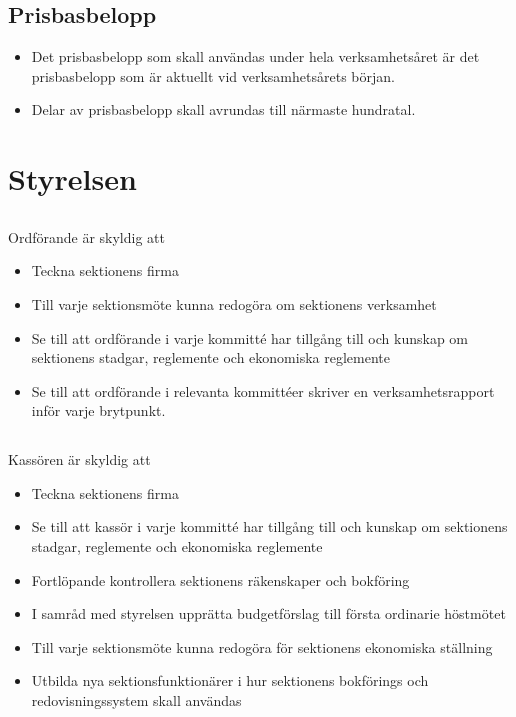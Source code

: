 \documentclass[a4paper, 10pt]{article}
\begin{document}
\subsection{Prisbasbelopp}
\begin{itemize}
  \item Det prisbasbelopp som skall användas under hela verksamhetsåret är det prisbasbelopp som är aktuellt vid verksamhetsårets början.
  \item Delar av prisbasbelopp skall avrundas till närmaste hundratal. 
\end{itemize}
\section{Styrelsen}
\subsection{}
Ordförande är skyldig att
\begin{itemize}
  \item Teckna sektionens firma
  \item Till varje sektionsmöte kunna redogöra om sektionens verksamhet
  \item Se till att ordförande i varje kommitté har tillgång till och kunskap om sektionens stadgar, reglemente och ekonomiska reglemente
  \item Se till att ordförande i relevanta kommittéer skriver en verksamhetsrapport inför varje brytpunkt.
\end{itemize}
\subsection{}
Kassören är skyldig att
\begin{itemize}
  \item Teckna sektionens firma
  \item Se till att kassör i varje kommitté har tillgång till och kunskap om sektionens stadgar, reglemente och ekonomiska reglemente 
  \item Fortlöpande kontrollera sektionens räkenskaper och bokföring
  \item I samråd med styrelsen upprätta budgetförslag till första ordinarie höstmötet
  \item Till varje sektionsmöte kunna redogöra för sektionens ekonomiska ställning
  \item Utbilda nya sektionsfunktionärer i hur sektionens bokförings och redovisningssystem skall användas
\end{itemize}
\end{document}
